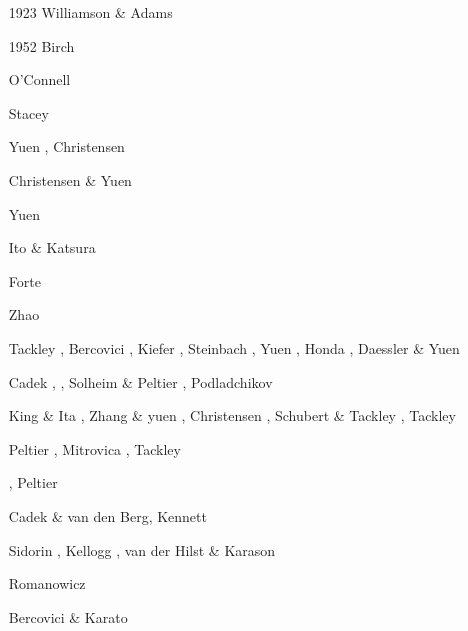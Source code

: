 \begin{scriptsize}
\begin{itemize}
\item[1923] Williamson \& Adams \cite{wiad23}
\item[1952] Birch \cite{birc52}
\item[\nineteenseventysix] O'Connell \cite{ocon76}
\item[\nineteenseventyseven] Stacey \cite{stac77}
\item[\nineteeneightytwo] Yuen \etal \cite{yusb82}, Christensen \cite{chri82}
\item[\nineteeneightyfive] Christensen \& Yuen \cite{chyu85}
\item[\nineteeneightysix] Yuen \cite{yuen86} 
\item[\nineteeneightynine] Ito \& Katsura \cite{itka89} 
\item[\nineteenninetyone] Forte \etal \cite{fopd91} 
\item[\nineteenninetytwo] Zhao \etal \cite{zhyh92}
\item[\nineteenninetythree] Tackley \etal \cite{tasg93}, Bercovici \etal \cite{best93}, 
                      Kiefer \cite{kief93}, Steinbach \etal \cite{styz93},
                      Yuen \etal \cite{yucc93}, Honda \etal \cite{hoby93}, 
                      Daessler \& Yuen \cite{dayu93} \\
\item[\nineteenninetyfour] Cadek \etal \cite{cays94}, \cite{vayv94}
                    \cite{zhgu94b}\cite{styu94}, Solheim \& Peltier \cite{sope94},
                    Podladchikov \etal \cite{popy94}
\item[\nineteenninetyfive] King \& Ita \cite{kiit95}, Zhang \& yuen \cite{zhyu95}, 
                     Christensen \cite{chri95}, Schubert \& Tackley \cite{scta95},
                     Tackley \cite{tack95}
\item[\nineteenninetysix] Peltier \cite{pelt96}, Mitrovica \cite{mitr96}, Tackley \cite{tack96b}
\item[\nineteenninetyseven] \cite{mifo97}, Peltier \etal \cite{pebs97}
\item[\nineteenninetyeight] Cadek \& van den Berg\cite{cava98}, Kennett \cite{kenn98}
\item[\nineteenninetynine] Sidorin \etal \cite{sigh99}, Kellogg \etal \cite{kehv99}, 
                     van der Hilst \& Karason \cite{vaka99}
\item[\twothousandone] Romanowicz \cite{roma01}
\item[\twothousandthree] Bercovici \& Karato \cite{beka03} 

\end{itemize}
\end{scriptsize}
